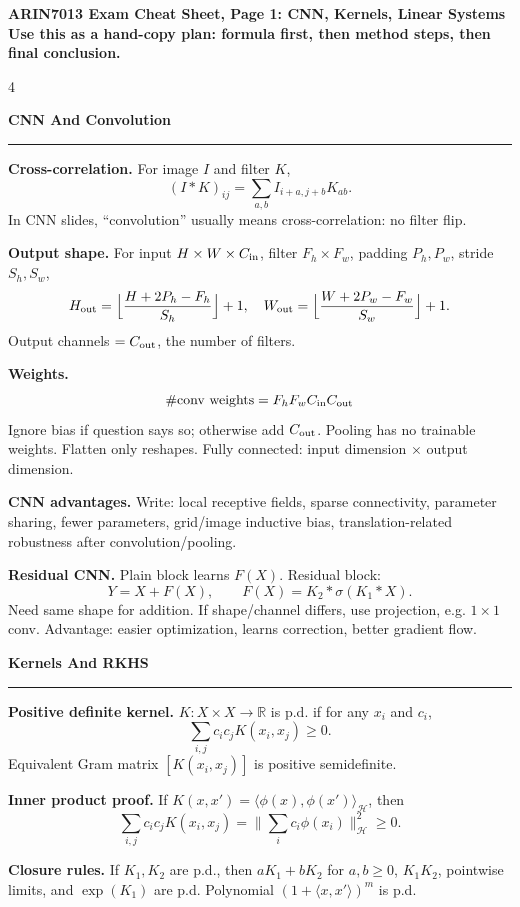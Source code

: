 \documentclass[10pt,a4paper,landscape]{article}
\newcommand{\topic}[1]{\vspace{2pt}\textbf{\large #1}\par\hrule\vspace{2pt}}
\newcommand{\subtopic}[1]{\textbf{#1.}}
\newcommand{\R}{\mathbb R}
\newcommand{\Hcal}{\mathcal H}
\begin{document}
\fontsize{8.45}{9.15}\selectfont

\begin{center}
{\Large \textbf{ARIN7013 Exam Cheat Sheet, Page 1: CNN, Kernels, Linear Systems}}\\[-1mm]
\textbf{Use this as a hand-copy plan: formula first, then method steps, then final conclusion.}
\end{center}

\begin{multicols*}{4}

\topic{CNN And Convolution}
\subtopic{Cross-correlation}
For image $I$ and filter $K$,
\[
(I*K)_{ij}=\sum_{a,b} I_{i+a,j+b}K_{ab}.
\]
In CNN slides, ``convolution'' usually means cross-correlation: no filter flip.

\subtopic{Output shape}
For input $H\times W\times C_{\rm in}$, filter $F_h\times F_w$, padding $P_h,P_w$, stride $S_h,S_w$,
\[
H_{\rm out}=\Big\lfloor {H+2P_h-F_h\over S_h}\Big\rfloor+1,\quad
W_{\rm out}=\Big\lfloor {W+2P_w-F_w\over S_w}\Big\rfloor+1.
\]
Output channels $=C_{\rm out}$, the number of filters.

\subtopic{Weights}
\[
\#\text{conv weights}=F_hF_wC_{\rm in}C_{\rm out}
\]
Ignore bias if question says so; otherwise add $C_{\rm out}$.
Pooling has no trainable weights. Flatten only reshapes.
Fully connected: input dimension $\times$ output dimension.

\subtopic{CNN advantages}
Write: local receptive fields, sparse connectivity, parameter sharing, fewer parameters, grid/image inductive bias, translation-related robustness after convolution/pooling.

\subtopic{Residual CNN}
Plain block learns $F(X)$. Residual block:
\[
Y=X+F(X),\qquad F(X)=K_2*\sigma(K_1*X).
\]
Need same shape for addition. If shape/channel differs, use projection, e.g. $1\times1$ conv. Advantage: easier optimization, learns correction, better gradient flow.

\topic{Kernels And RKHS}
\subtopic{Positive definite kernel}
$K:X\times X\to\R$ is p.d. if for any $x_i$ and $c_i$,
\[
\sum_{i,j}c_ic_jK(x_i,x_j)\ge0.
\]
Equivalent Gram matrix $[K(x_i,x_j)]$ is positive semidefinite.

\subtopic{Inner product proof}
If $K(x,x')=\langle \phi(x),\phi(x')\rangle_{\Hcal}$, then
\[
\sum_{i,j}c_ic_jK(x_i,x_j)
=\Big\|\sum_i c_i\phi(x_i)\Big\|_{\Hcal}^2\ge0.
\]

\subtopic{Closure rules}
If $K_1,K_2$ are p.d., then $aK_1+bK_2$ for $a,b\ge0$, $K_1K_2$, pointwise limits, and $\exp(K_1)$ are p.d.
Polynomial $(1+\langle x,x'\rangle)^m$ is p.d.


\end{multicols*}
\end{document}
